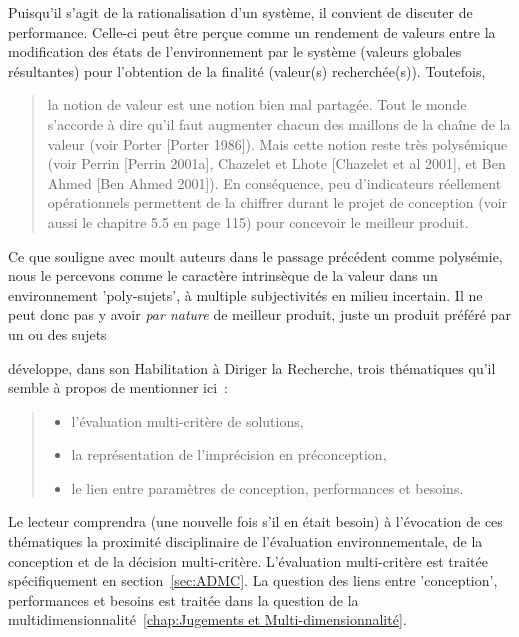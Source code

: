 Puisqu'il s'agit de la rationalisation d'un système, il convient de discuter de performance.
Celle-ci peut être perçue comme un rendement de valeurs entre la modification des états de l'environnement par le système (valeurs globales résultantes) pour l'obtention de la finalité (valeur(s) recherchée(s)).
Toutefois, \blockcquote{yannou_preconception_2001}{
la notion de valeur est une notion bien mal partagée.
Tout le monde s’accorde à dire qu’il faut augmenter chacun des maillons de la chaîne de la valeur (voir Porter [Porter 1986]).
Mais cette notion reste très polysémique (voir Perrin [Perrin 2001a], Chazelet et Lhote [Chazelet et al 2001], et Ben Ahmed [Ben Ahmed 2001]).
En conséquence, peu d’indicateurs réellement opérationnels permettent de la chiffrer durant le projet de conception (voir aussi le chapitre 5.5 en page 115) pour concevoir le meilleur produit.
}

Ce que \citeauthor{yannou_preconception_2001} souligne avec moult auteurs dans le passage précédent comme polysémie, nous le percevons comme le caractère intrinsèque de la valeur dans un environnement 'poly-sujets', à multiple subjectivités en milieu incertain.
Il ne peut donc pas y avoir \emph{par nature} de meilleur produit, juste un produit préféré par un ou des sujets

\citeauthor{yannou_preconception_2001} développe, dans son Habilitation à Diriger la Recherche, trois thématiques qu'il semble à propos de mentionner ici~:
\blockcquote{yannou_preconception_2001}{
\begin{itemize}
\item l’évaluation multi-critère de solutions,
\item la représentation de l’imprécision en préconception,
\item le lien entre paramètres de conception, performances et besoins.
\end{itemize}}

Le lecteur comprendra (une nouvelle fois s'il en était besoin) à l'évocation de ces thématiques la proximité disciplinaire de l'évaluation environnementale, de la conception et de la décision multi-critère.
L'évaluation multi-critère est traitée spécifiquement en section~\ref{sec:ADMC}.
La question des liens entre 'conception', performances et besoins est traitée dans la question de la multidimensionnalité~\ref{chap:Jugements et Multi-dimensionnalité}.

